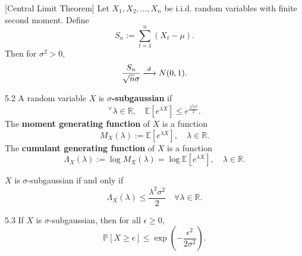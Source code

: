 \documentclass[10pt]{article}
\newenvironment{theorem*}[1]{%
  \IfBlankTF{#1}
    {\renewcommand{\themanualtheoreminner}{\unskip}}
    {\renewcommand\themanualtheoreminner{#1}}%
  \manualtheoreminner
}{\endmanualtheoreminner}
\theoremstyle{definition}
\newenvironment{definition*}[1]{%
  \IfBlankTF{#1}
    {\renewcommand{\themanualdefinitioninner}{\unskip}}
    {\renewcommand\themanualdefinitioninner{#1}}%
  \manualdefinitioninner
}{\endmanualdefinitioninner}
\newenvironment{remark*}[1]{%
  \IfBlankTF{#1}
    {\renewcommand{\themanualremarkinner}{\unskip}}
    {\renewcommand\themanualremarkinner{#1}}%
  \manualremarkinner
}{\endmanualremarkinner}
\begin{document}
\begin{theorem*}{}[Central Limit Theorem]
    Let $X_1, X_2, \ldots, X_n$ be i.i.d. random variables with finite second moment. Define
    \begin{equation*}
        S_n := \sum_{t=1}^n (X_t - \mu).
    \end{equation*}
    Then for $\sigma^2 >0$,
    \begin{equation*}
        \frac{S_n}{\sqrt{n} \sigma} \xlongrightarrow{ d } N(0,1).
    \end{equation*}
\end{theorem*}

\begin{definition*}{5.2}
    A random variable $X$ is \textbf{$\sigma$-subgaussian} if
    \begin{equation*}
        ^\forall \lambda \in \mathbb{R}, \quad \mathbb{E}\left[e^{\lambda X}\right] \leq e^{\frac{\lambda^2 \sigma^2}{2}}.
    \end{equation*}
    The \textbf{moment generating function} of $X$ is a function
    \begin{equation*}
        M_X(\lambda) := \mathbb{E}\left[e^{\lambda X}\right], \quad \lambda \in \mathbb{R}.
    \end{equation*}
    The \textbf{cumulant generating function} of $X$ is a function
    \begin{equation*}
        \Lambda_X(\lambda) := \log M_X(\lambda) = \log \mathbb{E}\left[e^{\lambda X}\right], \quad \lambda \in \mathbb{R}.
    \end{equation*}
\end{definition*}

\begin{remark*}{}
    $X$ is $\sigma$-subgaussian if and only if
    \begin{equation*}
        \Lambda_X(\lambda) \leq \frac{\lambda^2 \sigma^2}{2} \quad \forall \lambda \in \mathbb{R}.
    \end{equation*}
\end{remark*}

\begin{theorem*}{5.3}
    If $X$ is $\sigma$-subgaussian, then for all $\epsilon \geq 0$,
    \begin{equation*}
        \mathbb{P}[X \geq \epsilon] \leq \exp\left(-\frac{\epsilon^2}{2\sigma^2}\right).
    \end{equation*}
\end{theorem*}
\end{document}
